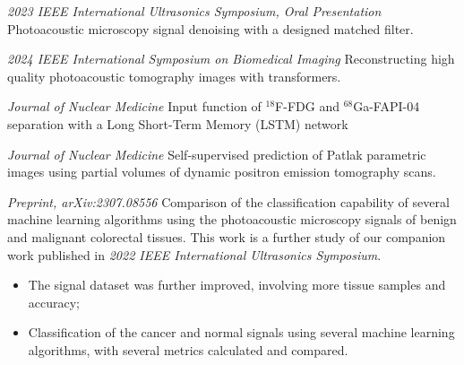 \documentclass{resume}
\begin{document}
\textit{2023 IEEE International Ultrasonics Symposium, Oral Presentation}
Photoacoustic microscopy signal denoising with a designed matched filter.

\textit{2024 IEEE International Symposium on Biomedical Imaging}
Reconstructing high quality photoacoustic tomography images with transformers.

\textit{Journal of Nuclear Medicine}
Input function of $^{18}$F-FDG and $^{68}$Ga-FAPI-04 separation with a Long Short-Term Memory (LSTM) network

\textit{Journal of Nuclear Medicine}
Self-supervised prediction of Patlak parametric images using partial volumes of dynamic positron emission tomography scans.

\textit{Preprint, arXiv:2307.08556}
Comparison of the classification capability of several machine learning algorithms using the photoacoustic microscopy signals of benign and malignant colorectal tissues. This work is a further study of our companion work published in \textit{2022 IEEE International Ultrasonics Symposium}.
\begin{itemize}
  \item The signal dataset was further improved, involving more tissue samples and accuracy;
  \item Classification of the cancer and normal signals using several machine learning algorithms, with several metrics calculated and compared.
\end{itemize}
\end{document}

